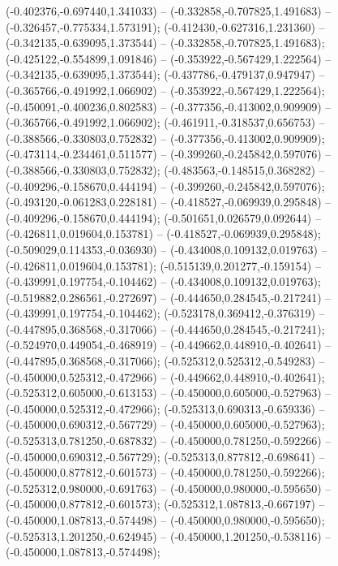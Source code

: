  (-0.402376,-0.697440,1.341033) -- (-0.332858,-0.707825,1.491683) -- (-0.326457,-0.775334,1.573191);
 (-0.412430,-0.627316,1.231360) -- (-0.342135,-0.639095,1.373544) -- (-0.332858,-0.707825,1.491683);
 (-0.425122,-0.554899,1.091846) -- (-0.353922,-0.567429,1.222564) -- (-0.342135,-0.639095,1.373544);
 (-0.437786,-0.479137,0.947947) -- (-0.365766,-0.491992,1.066902) -- (-0.353922,-0.567429,1.222564);
 (-0.450091,-0.400236,0.802583) -- (-0.377356,-0.413002,0.909909) -- (-0.365766,-0.491992,1.066902);
 (-0.461911,-0.318537,0.656753) -- (-0.388566,-0.330803,0.752832) -- (-0.377356,-0.413002,0.909909);
 (-0.473114,-0.234461,0.511577) -- (-0.399260,-0.245842,0.597076) -- (-0.388566,-0.330803,0.752832);
 (-0.483563,-0.148515,0.368282) -- (-0.409296,-0.158670,0.444194) -- (-0.399260,-0.245842,0.597076);
 (-0.493120,-0.061283,0.228181) -- (-0.418527,-0.069939,0.295848) -- (-0.409296,-0.158670,0.444194);
 (-0.501651,0.026579,0.092644) -- (-0.426811,0.019604,0.153781) -- (-0.418527,-0.069939,0.295848);
 (-0.509029,0.114353,-0.036930) -- (-0.434008,0.109132,0.019763) -- (-0.426811,0.019604,0.153781);
 (-0.515139,0.201277,-0.159154) -- (-0.439991,0.197754,-0.104462) -- (-0.434008,0.109132,0.019763);
 (-0.519882,0.286561,-0.272697) -- (-0.444650,0.284545,-0.217241) -- (-0.439991,0.197754,-0.104462);
 (-0.523178,0.369412,-0.376319) -- (-0.447895,0.368568,-0.317066) -- (-0.444650,0.284545,-0.217241);
 (-0.524970,0.449054,-0.468919) -- (-0.449662,0.448910,-0.402641) -- (-0.447895,0.368568,-0.317066);
 (-0.525312,0.525312,-0.549283) -- (-0.450000,0.525312,-0.472966) -- (-0.449662,0.448910,-0.402641);
 (-0.525312,0.605000,-0.613153) -- (-0.450000,0.605000,-0.527963) -- (-0.450000,0.525312,-0.472966);
 (-0.525313,0.690313,-0.659336) -- (-0.450000,0.690312,-0.567729) -- (-0.450000,0.605000,-0.527963);
 (-0.525313,0.781250,-0.687832) -- (-0.450000,0.781250,-0.592266) -- (-0.450000,0.690312,-0.567729);
 (-0.525313,0.877812,-0.698641) -- (-0.450000,0.877812,-0.601573) -- (-0.450000,0.781250,-0.592266);
 (-0.525312,0.980000,-0.691763) -- (-0.450000,0.980000,-0.595650) -- (-0.450000,0.877812,-0.601573);
 (-0.525312,1.087813,-0.667197) -- (-0.450000,1.087813,-0.574498) -- (-0.450000,0.980000,-0.595650);
 (-0.525313,1.201250,-0.624945) -- (-0.450000,1.201250,-0.538116) -- (-0.450000,1.087813,-0.574498);
